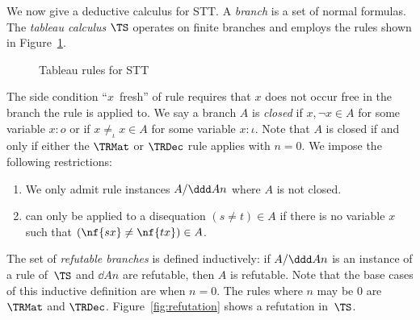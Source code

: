 We now give a deductive calculus for STT.
A \emph{branch} is a set of normal formulas.  The
\emph{tableau calculus $\TS$} operates on finite branches
and employs the rules shown in
Figure~\ref{fig-tableau-rules}.
\begin{figure}[t]
\caption{Tableau rules for STT}
\label{fig-tableau-rules}
\end{figure}
The side condition ``$x$~fresh'' of rule \TRFE requires
that $x$ does not occur free in the branch the rule is
applied to.  
We say a branch $A$ is \emph{closed} if $x,\neg x\in A$ for some variable $x:o$
or if $x\not=_\iota x\in A$ for some variable $x:\iota$.
Note that $A$ is closed if and only if either the $\TRMat$ or $\TRDec$ rule 
applies with $n=0$.
We impose the following restrictions:
\begin{enumerate}[(1)]
\item We only admit rule instances $A/\ddd A n$ where $A$ is not closed.
\item \TRFE can only be applied to a disequation
  $(s{\neq} t)\in A$ if there is no variable $x$ such that $(\nf{sx}\neq\nf{tx})\in A$.
\end{enumerate}
The set of \emph{refutable branches} is
defined inductively: if $A/\ddd A n$ is
an instance of a rule of~$\TS$ and $\dd A n$ are
refutable, then $A$ is refutable.
Note that the base cases of this inductive definition are when $n=0$.
The rules where $n$ may be $0$ are $\TRMat$ and $\TRDec$.
Figure~\ref{fig:refutation} shows a refutation
in~$\TS$.

